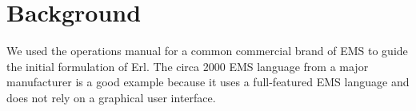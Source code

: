 \section{Background}\label{background}

We used the operations manual for a common commercial brand of EMS to guide the initial formulation of Erl. The circa 2000 EMS language from a major manufacturer is a good example because it uses a full-featured EMS language and does not rely on a graphical user interface.
